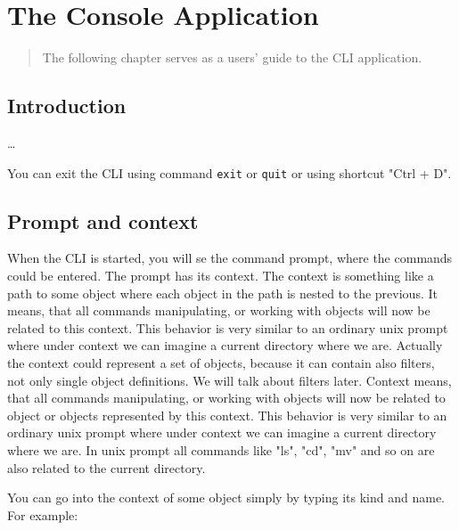 \documentclass[deska]{subfiles}
\begin{document}
\chapter{The Console Application}
\label{sec:cli-usage}

\begin{abstract}
The following chapter serves as a users' guide to the CLI application.
\end{abstract}


\section{Introduction}

\label{sec:cli-connection-setup}
\ldots

You can exit the CLI using command {\tt exit} or {\tt quit} or using shortcut "Ctrl + D".

\section{Prompt and context}

When the CLI is started, you will se the command prompt, where the commands could be entered. The prompt has its context.
The context is something like a path to some object where each object in the path is nested to the previous. 
It means, that all commands manipulating, or working with objects will now be related to this context. This behavior
is very similar to an ordinary unix prompt where under context we can imagine a current directory where we are. Actually the
context could represent a set of objects, because it can contain also filters, not only single object definitions.
We will talk about filters later. Context means, that all commands manipulating, or working with objects will now be related to
object or objects represented by this context. This behavior is very similar to an ordinary unix prompt where under context
we can imagine a current directory where we are. In unix prompt all commands like "ls", "cd", "mv" and so on are also related
to the current directory.

You can go into the context of some object simply by typing its kind and name. For example:
\end{document}
